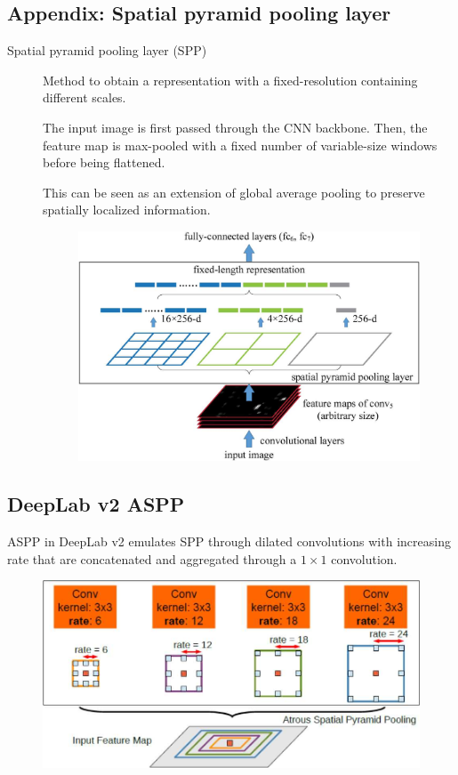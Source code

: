 \begin{subappendices}

\section{Appendix: Spatial pyramid pooling layer}
    \begin{description}
        \item[Spatial pyramid pooling layer (SPP)] 
            Method to obtain a representation with a fixed-resolution containing different scales.

            The input image is first passed through the CNN backbone. Then, the feature map is max-pooled with a fixed number of variable-size windows before being flattened.

            \begin{remark}
                This can be seen as an extension of global average pooling to preserve spatially localized information.
            \end{remark}

            \begin{figure}[H]
                \centering
                \includegraphics[width=0.5\linewidth]{./img/_spp.jpg}
            \end{figure}
    \end{description}


    \subsection{DeepLab v2 ASPP}

    ASPP in DeepLab v2 emulates SPP through dilated convolutions with increasing rate that are concatenated and aggregated through a $1 \times 1$ convolution.

    \begin{figure}[H]
        \centering
        \includegraphics[width=0.5\linewidth]{./img/aspp_deeplabv2.jpg}
    \end{figure}


\end{subappendices}

